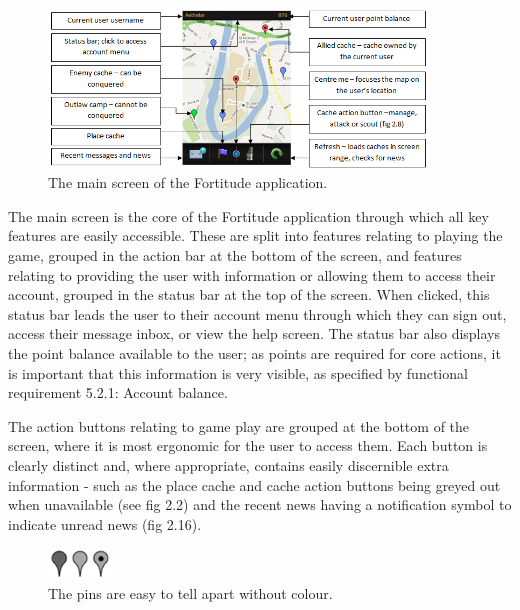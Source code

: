 \begin{figure}[ht]
	\begin{center}
	\includegraphics[width=0.9\textwidth]{images/main_screen}
	\caption{The main screen of the Fortitude application.}
	\label{main_screen}
	\end{center}
\end{figure}

The main screen is the core of the Fortitude application through which all key features are easily accessible. These are split into features relating to playing the game, grouped in the action bar at the bottom of the screen, and features relating to providing the user with information or allowing them to access their account, grouped in the status bar at the top of the screen. When clicked, this status bar leads the user to their account menu through which they can sign out, access their message inbox, or view the help screen. The status bar also displays the point balance available to the user; as points are required for core actions, it is important that this information is very visible, as specified by functional requirement 5.2.1: Account balance.

The action buttons relating to game play are grouped at the bottom of the screen, where it is most ergonomic for the user to access them. Each button is clearly distinct and, where appropriate, contains easily discernible extra information - such as the place cache and cache action buttons being greyed out when unavailable (see fig 2.2) and the recent news having a notification symbol to indicate unread news (fig 2.16). 

\begin{figure}
	\vspace{-20pt}
	\begin{center}
	\includegraphics[width=0.15\textwidth]{images/grey_pins}
	\caption{The pins are easy to tell apart without colour.}
	\label{grey_pins}
	\end{center}
	\vspace{-20pt}
\end{figure}


